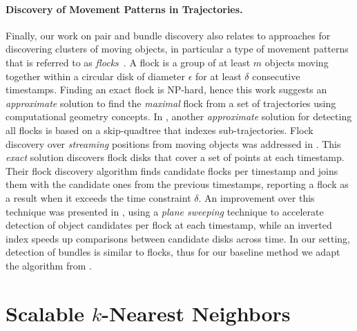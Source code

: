 \paragraph{Discovery of Movement Patterns in Trajectories.} Finally, our work on pair and bundle discovery also relates to approaches for discovering clusters of moving objects, in particular a type of movement patterns that is referred to as {\em flocks}~\cite{gudmundsson2006computing}. A flock is a group of at least $m$ objects moving together within a circular disk of diameter $\epsilon$ for at least $\delta$ consecutive timestamps. Finding an exact flock is NP-hard, hence this work suggests an \textit{approximate} solution to find the \textit{maximal} flock from a set of trajectories using computational geometry concepts. In \cite{benkert2008reporting}, another \textit{approximate} solution for detecting all flocks is based on a skip-quadtree that indexes sub-trajectories. Flock discovery over {\em streaming} positions from moving objects was addressed in \cite{vieira2009line}. This \textit{exact} solution discovers flock disks that cover a set of points at each timestamp. Their flock discovery algorithm finds candidate flocks per timestamp and joins them with the candidate ones from the previous timestamps, reporting a flock as a result when it exceeds the time constraint $\delta$. An improvement over this technique was presented in \cite{tanaka2015efficient}, using a \textit{plane sweeping} technique to accelerate detection of object candidates per flock at each timestamp, while an inverted index speeds up comparisons between candidate disks across time. In our setting, detection of bundles is similar to flocks, thus for our baseline method we adapt the algorithm from \cite{vieira2009line}.

\section{Scalable \texorpdfstring{$k$}--Nearest Neighbors}
\label{sec:knn_ml}

